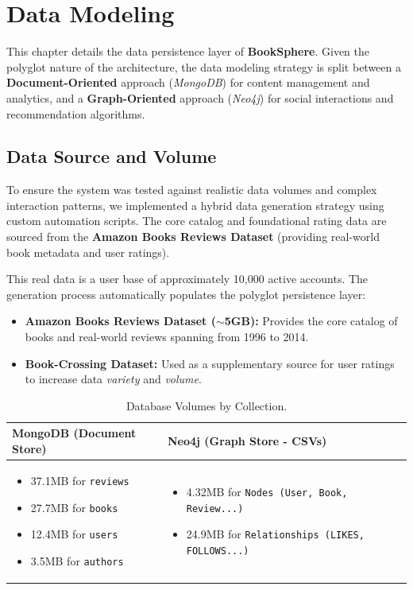 \chapter{Data Modeling}
\label{chap:data_modeling}

This chapter details the data persistence layer of \textbf{BookSphere}. Given the polyglot nature of the architecture, the data modeling strategy is split between a \textbf{Document-Oriented} approach (\textit{MongoDB}) for content management and analytics, and a \textbf{Graph-Oriented} approach (\textit{Neo4j}) for social interactions and recommendation algorithms.

\section{Data Source and Volume}
To ensure the system was tested against realistic data volumes and complex interaction patterns, we implemented a hybrid data generation strategy using custom automation scripts. The core catalog and foundational rating data are sourced from the \textbf{Amazon Books Reviews Dataset} (providing real-world book metadata and user ratings). 

This real data is a user base of approximately 10,000 active accounts. The generation process automatically populates the polyglot persistence layer:


\begin{itemize}
    \item \textbf{Amazon Books Reviews Dataset ($\sim$5GB):} Provides the core catalog of books and real-world reviews spanning from 1996 to 2014.
    \item \textbf{Book-Crossing Dataset:} Used as a supplementary source for user ratings to increase data \textit{variety} and \textit{volume}.
\end{itemize}
\begin{table}[h]
    \centering
    \renewcommand{\arraystretch}{1.5}
    \begin{tabular}{|p{}|p{}|}
        \hline
        \textbf{MongoDB (Document Store)} & \textbf{Neo4j (Graph Store - CSVs)} \\
        \hline
        \begin{itemize}
            \item 37.1MB for \texttt{reviews}
            \item 27.7MB for \texttt{books}
            \item 12.4MB for \texttt{users}
            \item 3.5MB for \texttt{authors}
        \end{itemize} 
        & 
        \begin{itemize}
            \item 4.32MB for \texttt{Nodes (User, Book, Review...)}
            \item 24.9MB for \texttt{Relationships (LIKES, FOLLOWS...)}
        \end{itemize} \\
        \hline
    \end{tabular}
    \caption{Database Volumes by Collection.}
    \label{tab:db_volumes}
\end{table}

